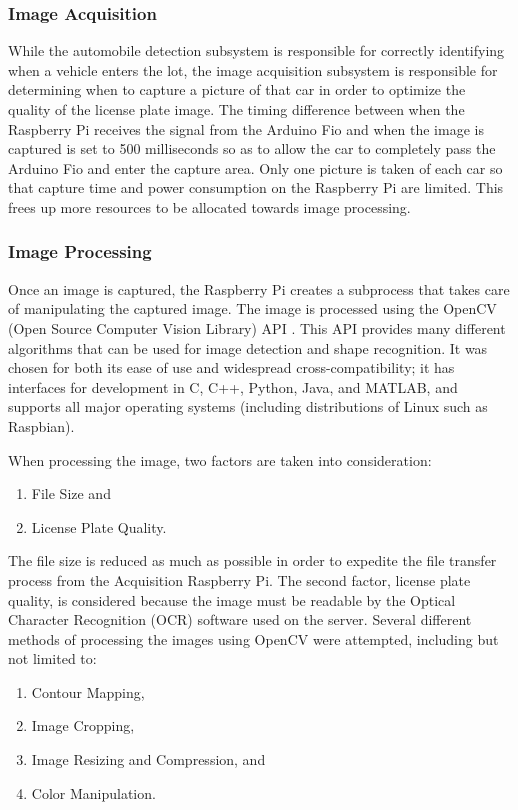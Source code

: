 \documentclass[11pt, oneside, fullpage, doublespace]{article}
\begin{document}
\subsubsection{Image Acquisition}
While the automobile detection subsystem is responsible for correctly identifying when a vehicle enters the lot, the image acquisition subsystem is responsible for determining when to capture a picture of that car in order to optimize the quality of the license plate image. The timing difference between when the Raspberry Pi receives the signal from the Arduino Fio and when the image is captured is set to 500 milliseconds so as to allow the car to completely pass the Arduino Fio and enter the capture area. Only one picture is taken of each car so that capture time and power consumption on the Raspberry Pi are limited. This frees up more resources to be allocated towards image processing.

\subsubsection{Image Processing}
Once an image is captured, the Raspberry Pi creates a subprocess that takes care of manipulating the captured image. The image is processed using the OpenCV (Open Source Computer Vision Library) API \cite{openCV}. This API provides many different algorithms that can be used for image detection and shape recognition. It was chosen for both its ease of use and widespread cross-compatibility; it has interfaces for development in C, C++, Python, Java, and MATLAB, and supports all major operating systems (including distributions of Linux such as Raspbian). 

When processing the image, two factors are taken into consideration:
\begin{enumerate}
\item File Size and
\item License Plate Quality.
\end{enumerate}
The file size is reduced as much as possible in order to expedite the file transfer process from the Acquisition Raspberry Pi. The second factor, license plate quality, is considered because the image must be readable by the Optical Character Recognition (OCR) software used on the server. Several different methods of processing the images using OpenCV were attempted, including but not limited to:
\begin{enumerate}
\item Contour Mapping,
\item Image Cropping,
\item Image Resizing and Compression, and
\item Color Manipulation.
\end{enumerate}
\end{document}
